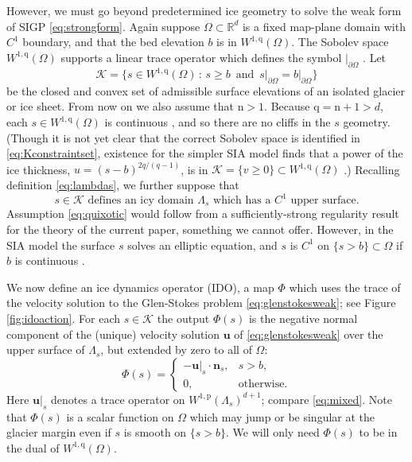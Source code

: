 \documentclass[letterpaper,final,12pt,reqno]{amsart}
\theoremstyle{claim}
\newcommand{\RR}{\mathbb{R}}
\newcommand{\bn}{\mathbf{n}}
\newcommand{\bu}{\mathbf{u}}
\newcommand{\nn}{{\text{n}}}
\newcommand{\pp}{{\text{p}}}
\newcommand{\qq}{{\text{q}}}
\numberwithin{equation}{section}
\numberwithin{figure}{section}
\numberwithin{table}{section}
\numberwithin{theorem}{section}
\begin{document}
However, we must go beyond predetermined ice geometry to solve the weak form of SIGP \eqref{eq:strongform}.  Again suppose $\Omega \subset \RR^d$ is a fixed map-plane domain with $C^1$ boundary, and that the bed elevation $b$ is in $W^{1,\qq}(\Omega)$.  The Sobolev space $W^{1,\qq}(\Omega)$ supports a linear trace operator which defines the symbol $|_{\partial \Omega}$ \cite[Section 5.5]{Evans2010}.  Let
\begin{equation}
\mathcal{K} = \{s \in W^{1,\qq}(\Omega) \,:\, s \ge b \, \text{ and } \, s\big|_{\partial\Omega} = b\big|_{\partial\Omega}\}  \label{eq:Kconstraintset}
\end{equation}
be the closed and convex set of admissible surface elevations of an isolated glacier or ice sheet.  From now on we also assume that $\nn>1$.  Because $\qq = \nn+1 > d$, each $s \in W^{1,\qq}(\Omega)$ is continuous \cite[Morrey's inequality, section 5.6.2]{Evans2010}, and so there are no cliffs in the $s$ geometry.  (Though it is not yet clear that the correct Sobolev space is identified in \eqref{eq:Kconstraintset}, existence for the simpler SIA model finds that a power of the ice thickness, $u=(s-b)^{2q/(q-1)}$, is in $\mathcal{K} = \{v \ge 0\} \subset W^{1,\qq}(\Omega)$ \cite{JouvetBueler2012}.)  Recalling definition \eqref{eq:lambdas}, we further suppose that
\begin{equation}
s\in \mathcal{K} \text{ defines an icy domain } \Lambda_s \text{ which has a $C^1$ upper surface.} \label{eq:quixotic}
\end{equation}
Assumption \eqref{eq:quixotic} would follow from a sufficiently-strong regularity result for the theory of the current paper, something we cannot offer.  However, in the SIA model the surface $s$ solves an elliptic equation, and $s$ is $C^1$ on $\{s>b\} \subset \Omega$ if $b$ is continuous \cite{JouvetBueler2012}.

We now define an ice dynamics operator (IDO), a map $\Phi$ which uses the trace of the velocity solution to the Glen-Stokes problem \eqref{eq:glenstokesweak}; see Figure \ref{fig:idoaction}.  For each $s \in \mathcal{K}$ the output $\Phi(s)$ is the negative normal component of the (unique) velocity solution $\bu$ of \eqref{eq:glenstokesweak} over the upper surface of $\Lambda_s$, but extended by zero to all of $\Omega$:
\begin{equation}
\Phi(s) = \begin{cases} - \bu|_s \cdot \bn_s, & s > b, \\
                        0, & \text{otherwise}. \end{cases} \label{eq:ido}
\end{equation}
Here $\bu|_s$ denotes a trace operator on $W^{1,\pp}(\Lambda_s)^{d+1}$; compare \eqref{eq:mixed}.  Note that $\Phi(s)$ is a scalar function on $\Omega$ which may jump or be singular at the glacier margin even if $s$ is smooth on $\{s>b\}$.  We will only need $\Phi(s)$ to be in the dual of $W^{1,\qq}(\Omega)$.
\end{document}
